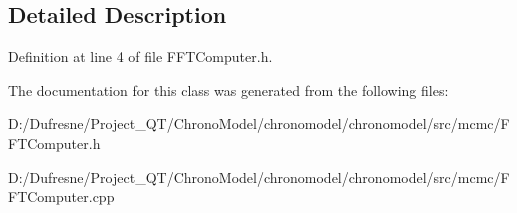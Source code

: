 \subsection{Detailed Description}


Definition at line 4 of file F\-F\-T\-Computer.\-h.



The documentation for this class was generated from the following files\-:\begin{DoxyCompactItemize}
\item 
D\-:/\-Dufresne/\-Project\-\_\-\-Q\-T/\-Chrono\-Model/chronomodel/chronomodel/src/mcmc/F\-F\-T\-Computer.\-h\item 
D\-:/\-Dufresne/\-Project\-\_\-\-Q\-T/\-Chrono\-Model/chronomodel/chronomodel/src/mcmc/F\-F\-T\-Computer.\-cpp\end{DoxyCompactItemize}
